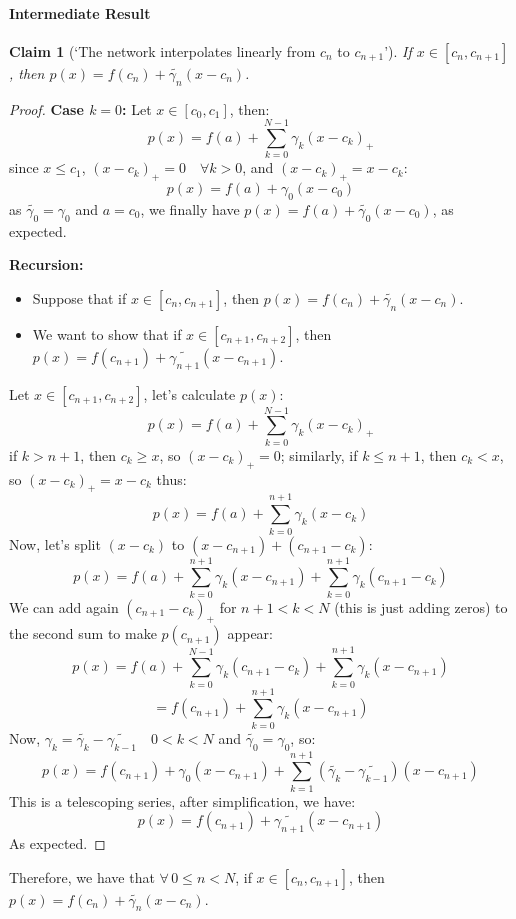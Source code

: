 \documentclass[]{article}
\newtheorem*{claim}{Claim}
\begin{document}
\paragraph{Intermediate Result}
\begin{claim}[`The network interpolates linearly from $c_n$ to $c_{n+1}$']
	If $x \in \left[ c_n, c_{n+1} \right]$, then $p(x) = f(c_n) + \tilde{\gamma_n}(x-c_n)$.
\end{claim}
\begin{proof}
	\textbf{Case $k=0$:}\newline
	Let $x \in \left[ c_0, c_1 \right]$, then:
	$$p(x) = f(a) + \sum_{k=0}^{N-1} \gamma_k (x - c_k)_+$$
	since $x \leq c_1$, $(x - c_k)_+ = 0 \quad \forall k>0$, and $(x - c_k)_+ = x - c_k$: 
	$$p(x) = f(a) + \gamma_0 (x - c_0)$$
	as $\tilde{\gamma_0} =\gamma_0$ and $a = c_0$, we finally have $p(x) = f(a) + \tilde{\gamma_0}(x - c_0)$, as expected.
	
	\textbf{Recursion:}\newline
	\begin{itemize}
		\item Suppose that if $x \in \left[ c_n, c_{n+1} \right]$, then $p(x) = f(c_n) + \tilde{\gamma_n}(x-c_n)$.
		\item We want to show that if $x \in \left[ c_{n+1}, c_{n+2} \right]$, then $p(x) = f(c_{n+1}) + \tilde{\gamma_{n+1}}(x-c_{n+1})$.
	\end{itemize}
	Let $x \in \left[ c_{n+1}, c_{n+2} \right]$, let's calculate $p(x)$:
	$$p(x) = f(a) + \sum_{k=0}^{N-1} \gamma_k (x - c_k)_+$$
	if $k > n+1$, then $c_k \geq x$, so $(x - c_k)_+ = 0$; similarly, 
	if $k \leq n+1$, then $c_k < x$, so $(x - c_k)_+ = x - c_k$ thus:
	$$p(x) = f(a) + \sum_{k=0}^{n+1} \gamma_k (x - c_k)$$
	Now, let's split $(x - c_k)$ to $(x - c_{n+1}) + (c_{n+1} - c_k)$:
	$$p(x) = f(a) + \sum_{k=0}^{n+1} \gamma_k (x - c_{n+1}) + \sum_{k=0}^{n+1} \gamma_k (c_{n+1} - c_k)$$
	We can add again $(c_{n+1} - c_k)_+$ for $n+1 < k < N$ (this is just adding zeros) to the second sum to make $p(c_{n+1})$ appear:
	$$p(x) = f(a) + \sum_{k=0}^{N-1} \gamma_k (c_{n+1} - c_k) + \sum_{k=0}^{n+1} \gamma_k (x - c_{n+1})$$
	$$= f(c_{n+1}) + \sum_{k=0}^{n+1} \gamma_k (x - c_{n+1})$$
	Now, $\gamma_k = \tilde{\gamma_k} - \tilde{\gamma_{k-1}} \quad 0 < k <N$ and $\tilde{\gamma_0} = \gamma_0$, so:
	$$p(x) = f(c_{n+1}) + \gamma_0 (x - c_{n+1}) + \sum_{k=1}^{n+1} (\tilde{\gamma_k} - \tilde{\gamma_{k-1}}) (x - c_{n+1})$$
	This is a telescoping series, after simplification, we have:
	$$p(x) = f(c_{n+1}) + \tilde{\gamma_{n+1}} (x - c_{n+1})$$
	As expected.
\end{proof}
Therefore, we have that $\forall\, 0 \leq n < N$, if $x \in \left[ c_n, c_{n+1} \right]$, then $p(x) = f(c_n) + \tilde{\gamma_n}(x-c_n)$.
\end{document}
